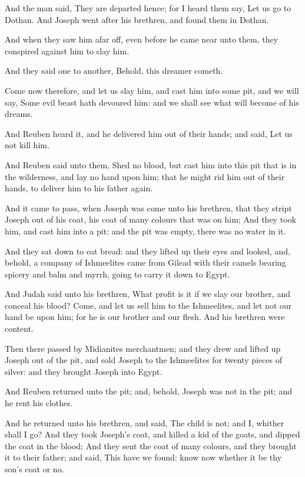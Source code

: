\verse And the man said, They are departed hence; for I heard them say, Let us go to Dothan. And Joseph went after his brethren, and found them in Dothan.

\verse And when they saw him afar off, even before he came near unto them, they conspired against him to slay him.

\verse And they said one to another, Behold, this dreamer cometh.

\verse Come now therefore, and let us slay him, and cast him into some pit, and we will say, Some evil beast hath devoured him: and we shall see what will become of his dreams.

\verse And Reuben heard it, and he delivered him out of their hands; and said, Let us not kill him.

\verse And Reuben said unto them, Shed no blood, but cast him into this pit that is in the wilderness, and lay no hand upon him; that he might rid him out of their hands, to deliver him to his father again.

\verse And it came to pass, when Joseph was come unto his brethren, that they stript Joseph out of his coat, his coat of many colours that was on him; \verse And they took him, and cast him into a pit: and the pit was empty, there was no water in it.

\verse And they sat down to eat bread: and they lifted up their eyes and looked, and, behold, a company of Ishmeelites came from Gilead with their camels bearing spicery and balm and myrrh, going to carry it down to Egypt.

\verse And Judah said unto his brethren, What profit is it if we slay our brother, and conceal his blood?  \verse Come, and let us sell him to the Ishmeelites, and let not our hand be upon him; for he is our brother and our flesh. And his brethren were content.

\verse Then there passed by Midianites merchantmen; and they drew and lifted up Joseph out of the pit, and sold Joseph to the Ishmeelites for twenty pieces of silver: and they brought Joseph into Egypt.

\verse And Reuben returned unto the pit; and, behold, Joseph was not in the pit; and he rent his clothes.

\verse And he returned unto his brethren, and said, The child is not; and I, whither shall I go?  \verse And they took Joseph's coat, and killed a kid of the goats, and dipped the coat in the blood; \verse And they sent the coat of many colours, and they brought it to their father; and said, This have we found: know now whether it be thy son's coat or no.

